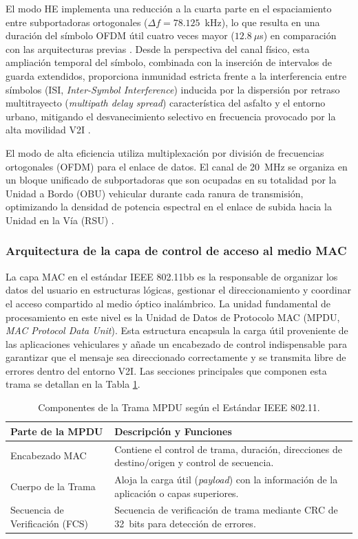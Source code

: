 El modo HE implementa una reducción a la cuarta parte en el espaciamiento entre subportadoras ortogonales ($\Delta f = 78.125$~kHz), lo que resulta en una duración del símbolo OFDM útil cuatro veces mayor ($12.8~\mu$s) en comparación con las arquitecturas previas \cite{ieee80211bb2023}. Desde la perspectiva del canal físico, esta ampliación temporal del símbolo, combinada con la inserción de intervalos de guarda extendidos, proporciona inmunidad estricta frente a la interferencia entre símbolos (ISI, \textit{Inter-Symbol Interference}) inducida por la dispersión por retraso multitrayecto (\textit{multipath delay spread}) característica del asfalto y el entorno urbano, mitigando el desvanecimiento selectivo en frecuencia provocado por la alta movilidad V2I \cite{luo2017vlc}.

El modo de alta eficiencia utiliza multiplexación por división de frecuencias ortogonales (OFDM) para el enlace de datos. El canal de 20~MHz se organiza en un bloque unificado de subportadoras que son ocupadas en su totalidad por la Unidad a Bordo (OBU) vehicular durante cada ranura de transmisión, optimizando la densidad de potencia espectral en el enlace de subida hacia la Unidad en la Vía (RSU) \cite{feukeu2023enhancing}.


\subsubsection{Arquitectura de la capa de control de acceso al medio MAC}
La capa MAC en el estándar IEEE 802.11bb es la responsable de organizar los datos del usuario en estructuras lógicas, gestionar el direccionamiento y coordinar el acceso compartido al medio óptico inalámbrico. La unidad fundamental de procesamiento en este nivel es la Unidad de Datos de Protocolo MAC (MPDU, \textit{MAC Protocol Data Unit}). Esta estructura encapsula la carga útil proveniente de las aplicaciones vehiculares y añade un encabezado de control indispensable para garantizar que el mensaje sea direccionado correctamente y se transmita libre de errores dentro del entorno V2I. Las secciones principales que componen esta trama se detallan en la Tabla \ref{tab:mpdu}.

\begin{table}[htbp]
	\centering
	\caption{Componentes de la Trama MPDU según el Estándar IEEE 802.11.}
	\label{tab:mpdu}
	\begin{tabular}{|p{3.5cm}|p{10.5cm}|}
		\hline
		\textbf{Parte de la MPDU} & \textbf{Descripción y Funciones} \\ \hline
		Encabezado MAC & Contiene el control de trama, duración, direcciones de destino/origen y control de secuencia. \\ \hline
		Cuerpo de la Trama & Aloja la carga útil (\textit{payload}) con la información de la aplicación o capas superiores. \\ \hline
		Secuencia de Verificación (FCS) & Secuencia de verificación de trama mediante CRC de 32~bits para detección de errores. \\ \hline
	\end{tabular}
\end{table}

